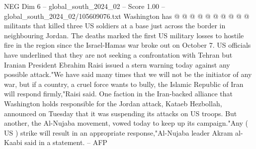 \begin{textsample}{NEG Dim 6 – global\_south\_2024\_02 – Score 1.00 – global\_south\_2024\_02/105609076.txt}
Washington has @ @ @ @ @ @ @ @ @ @ militants that killed three US soldiers at a base just across the border in neighbouring Jordan.
The deaths marked the first US military losses to hostile fire in the region since the Israel-Hamas war broke out on October 7.
US officials have underlined that they are not seeking a confrontation with Tehran but Iranian President Ebrahim Raisi issued a stern warning today against any possible attack."We have said many times that we will not be the initiator of any war, but if a country, a cruel force wants to bully, the Islamic Republic of Iran will respond firmly,"Raisi said.
One faction in the Iran-backed alliance that Washington holds responsible for the Jordan attack, Kataeb Hezbollah, announced on Tuesday that it was suspending its attacks on US troops.
But another, the Al-Nujaba movement, vowed today to keep up its campaign."Any ( US ) strike will result in an appropriate response,"Al-Nujaba leader Akram al-Kaabi said in a statement. -- AFP

\end{textsample}
